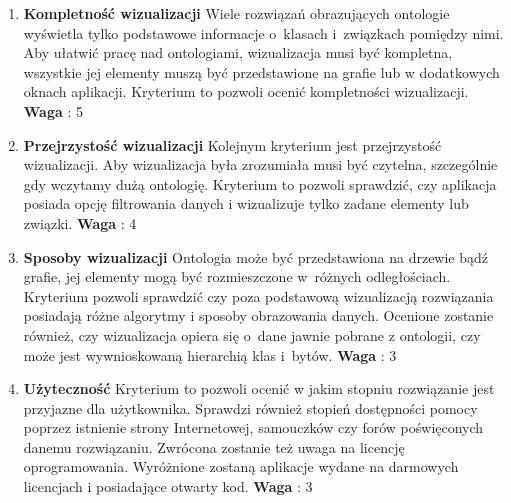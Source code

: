 \begin{enumerate}
 \item{\bf Kompletność wizualizacji} 
  \nopagebreak   \newline
Wiele rozwiązań obrazujących ontologie wyświetla tylko podstawowe informacje o~klasach i~związkach pomiędzy nimi. Aby ułatwić pracę nad ontologiami, 
wizualizacja musi być kompletna, wszystkie jej elementy muszą być przedstawione na grafie lub w dodatkowych oknach aplikacji.  Kryterium to pozwoli
ocenić kompletności wizualizacji. 
  \nopagebreak  \newline
{\bf Waga} : 5

 \item{\bf Przejrzystość wizualizacji}  \newline
  \nopagebreak                  
Kolejnym kryterium jest przejrzystość wizualizacji. Aby wizualizacja była zrozumiała musi być czytelna, szczególnie gdy wczytamy dużą ontologię. 
Kryterium to pozwoli sprawdzić, czy aplikacja posiada opcję filtrowania danych i wizualizuje tylko zadane elementy lub związki. 
  \nopagebreak \newline
{\bf Waga} : 4

 \item{\bf Sposoby wizualizacji} \newline
  \nopagebreak                  
  Ontologia może być przedstawiona na drzewie bądź grafie, jej elementy mogą być rozmieszczone w~różnych odległościach. Kryterium pozwoli sprawdzić
czy poza podstawową wizualizacją rozwiązania posiadają różne algorytmy i sposoby obrazowania danych. Ocenione zostanie również, czy wizualizacja 
opiera się o~dane jawnie pobrane z ontologii, czy może jest wywnioskowaną hierarchią klas i~bytów.   
  \nopagebreak \newline
{\bf Waga} : 3


 \item{\bf Użyteczność} \newline
  \nopagebreak                  
  Kryterium to pozwoli ocenić w jakim stopniu rozwiązanie jest przyjazne dla użytkownika. Sprawdzi również stopień dostępności pomocy poprzez 
istnienie strony Internetowej, samouczków czy forów poświęconych danemu rozwiązaniu. Zwrócona zostanie też uwaga na licencję oprogramowania. Wyróżnione 
zostaną aplikacje wydane na darmowych licencjach i posiadające otwarty kod. \newline
  \nopagebreak 
{\bf Waga} : 3

\end{enumerate}




